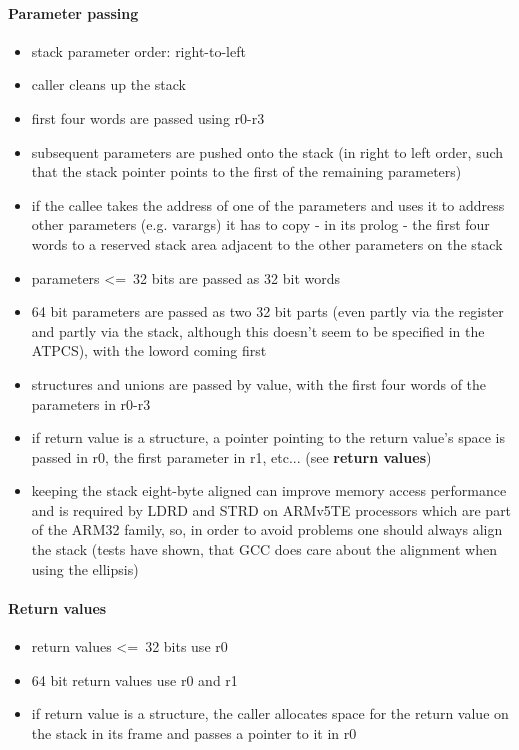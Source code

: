 \paragraph{Parameter passing}

\begin{itemize}
\item stack parameter order: right-to-left
\item caller cleans up the stack
\item first four words are passed using r0-r3
\item subsequent parameters are pushed onto the stack (in right to left order, such that the stack pointer points to the first of the remaining parameters)
\item if the callee takes the address of one of the parameters and uses it to address other parameters (e.g. varargs) it has to copy - in its prolog - the first four words to a reserved stack area adjacent to the other parameters on the stack
\item parameters \textless=\ 32 bits are passed as 32 bit words
\item 64 bit parameters are passed as two 32 bit parts (even partly via the register and partly via the stack, although this doesn't seem to be specified in the ATPCS), with the loword coming first
\item structures and unions are passed by value, with the first four words of the parameters in r0-r3
\item if return value is a structure, a pointer pointing to the return value's space is passed in r0, the first parameter in r1, etc... (see {\bf return values})
\item keeping the stack eight-byte aligned can improve memory access performance and is required by LDRD and STRD on ARMv5TE processors which are part of the ARM32 family, so, in order to avoid problems one should always align the stack (tests have shown, that GCC does care about the alignment when using the ellipsis)
\end{itemize}

\paragraph{Return values}
\begin{itemize}
\item return values \textless=\ 32 bits use r0
\item 64 bit return values use r0 and r1
\item if return value is a structure, the caller allocates space for the return value on the stack in its frame and passes a pointer to it in r0
\end{itemize}

